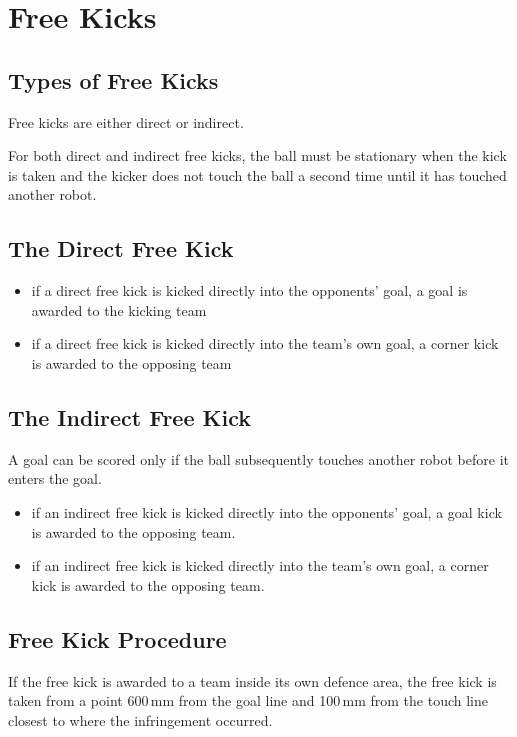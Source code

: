 \section{Free Kicks}\label{sec:free-kicks}

\subsection{Types of Free Kicks}
Free kicks are either direct or indirect.

For both direct and indirect free kicks, the ball must be stationary when the kick is taken and the kicker does not touch the ball a second time until it has touched another robot.

\subsection{The Direct Free Kick}
\begin{itemize}
\item if a direct free kick is kicked directly into the opponents' goal, a goal is awarded to the
kicking team
\item if a direct free kick is kicked directly into the team's own goal, a corner kick is awarded
to the
opposing team
\end{itemize}

\subsection{The Indirect Free Kick}
A goal can be scored only if the ball subsequently touches another robot before it enters the goal.

\begin{itemize}
\item if an indirect free kick is kicked directly into the opponents' goal, a goal kick is awarded
to the opposing team.
\item if an indirect free kick is kicked directly into the team's own goal, a corner kick is
awarded to the opposing team.
\end{itemize}

\subsection{Free Kick Procedure}
If the free kick is awarded to a team inside  its own defence area, the free kick is taken from a point 600\,mm from the goal line and 100\,mm from the touch line closest to where the infringement occurred.

